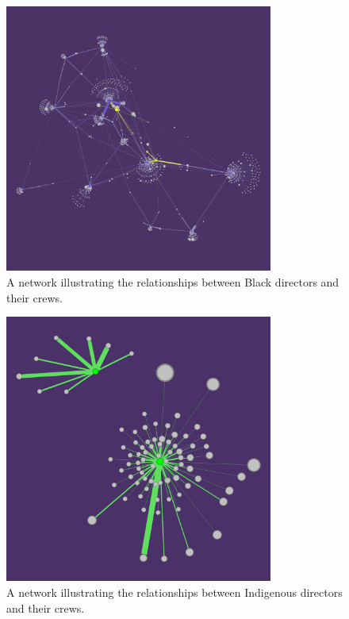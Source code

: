 \documentclass[12pt]{article}
\begin{document}
\begin{figure}[H]
    \centering
    \includegraphics[width=250pt, scale=0.5] {3_black_egonetwork.jpg}
    \caption{A network illustrating the relationships between Black directors and their crews.}
    \label{fig:blackEgo}
\end{figure}
\begin{figure}[H]
    \centering
    \includegraphics[width=250pt, scale=0.5] {3_indigenous_egonetwork.jpg}
    \caption{A network illustrating the relationships between Indigenous directors and their crews.}
    \label{fig:indigenousEgo}
\end{figure}
\end{document}
